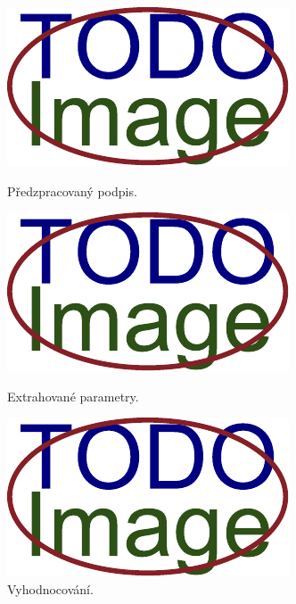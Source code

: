 \begin{figure}[h]
  \centering
  \begin{minipage}{0.3\textwidth}
      \centering
      \includegraphics[width=\textwidth]{obrazky-figures/placeholder.pdf}
      \caption{Předzpracovaný podpis.}
      \label{fig:first-image}
  \end{minipage}\hfill
  \begin{minipage}{0.3\textwidth}
      \centering
      \includegraphics[width=\textwidth]{obrazky-figures/placeholder.pdf}
      \caption{Extrahované parametry.}
      \label{fig:second-image}
  \end{minipage}\hfill
  \begin{minipage}{0.3\textwidth}
    \centering
    \includegraphics[width=\textwidth]{obrazky-figures/placeholder.pdf}
    \caption{Vyhodnocování.}
    \label{fig:second-image}
  \end{minipage}
\end{figure}

